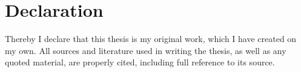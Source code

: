 \chapter*{Declaration}

Thereby I declare that this thesis is my original work, which I have created
on my own. All sources and literature used in writing the thesis, as well as
any quoted material, are properly cited, including full reference to its source.
